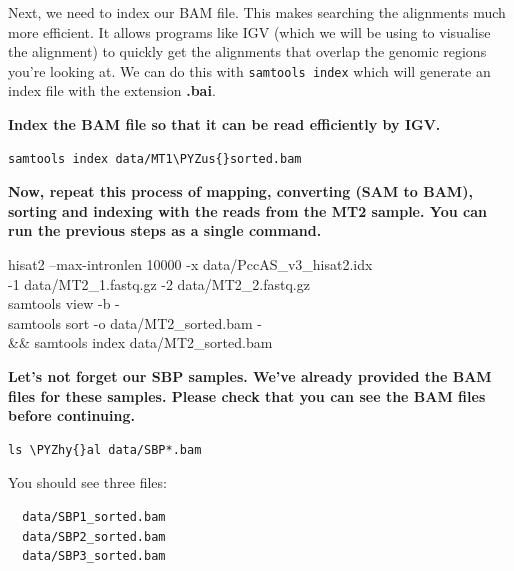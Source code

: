 \documentclass[11pt]{article}
\makeatletter
\def\PYZus{\char`\_}
\def\PYZhy{\char`\-}
\newcommand{\boxspacing}{\kern\kvtcb@left@rule\kern\kvtcb@boxsep}
\newcommand{\prompt}[4]{
        \ttfamily\llap{{\color{#2}[#3]:\hspace{3pt}#4}}\vspace{-\baselineskip}
    }
\makeatother
\begin{document}
    Next, we need to index our BAM file. This makes searching the alignments
much more efficient. It allows programs like IGV (which we will be using
to visualise the alignment) to quickly get the alignments that overlap
the genomic regions you're looking at. We can do this with
\texttt{samtools\ index} which will generate an index file with the
extension \textbf{.bai}.

    \textbf{Index the BAM file so that it can be read efficiently by IGV.}

    \begin{tcolorbox}[breakable, size=fbox, boxrule=1pt, pad at break*=1mm,colback=cellbackground, colframe=cellborder]
\prompt{In}{incolor}{ }{\boxspacing}
\begin{Verbatim}[commandchars=\\\{\}]
samtools index data/MT1\PYZus{}sorted.bam
\end{Verbatim}
\end{tcolorbox}

    \textbf{Now, repeat this process of mapping, converting (SAM to BAM),
sorting and indexing with the reads from the MT2 sample. You can run the
previous steps as a single command.}

    hisat2 --max-intronlen 10000 -x data/PccAS\_v3\_hisat2.idx\\
-1 data/MT2\_1.fastq.gz -2 data/MT2\_2.fastq.gz\\
\textbar{} samtools view -b -\\
\textbar{} samtools sort -o data/MT2\_sorted.bam -\\
\&\& samtools index data/MT2\_sorted.bam

    \textbf{Let's not forget our SBP samples. We've already provided the BAM
files for these samples. Please check that you can see the BAM files
before continuing.}

    \begin{tcolorbox}[breakable, size=fbox, boxrule=1pt, pad at break*=1mm,colback=cellbackground, colframe=cellborder]
\prompt{In}{incolor}{ }{\boxspacing}
\begin{Verbatim}[commandchars=\\\{\}]
ls \PYZhy{}al data/SBP*.bam
\end{Verbatim}
\end{tcolorbox}

    You should see three files:

\begin{verbatim}
  data/SBP1_sorted.bam
  data/SBP2_sorted.bam
  data/SBP3_sorted.bam
\end{verbatim}
\end{document}
